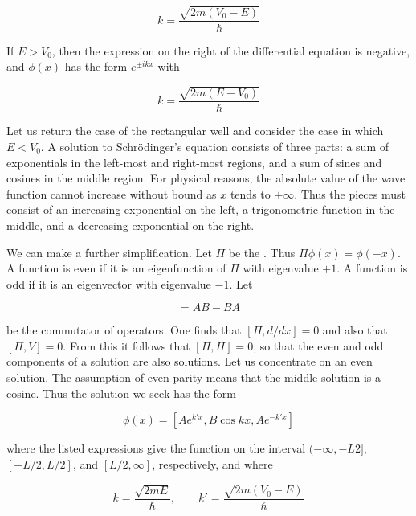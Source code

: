 \begin{equation}
k = \frac{\sqrt{2m(V_0-E)}}{\hbar}
\end{equation}

If $E > V_0$, then the expression on the right of the differential equation is negative, and  $\phi(x)$ has the form $e^{\pm i kx}$ with

\begin{equation}
k = \frac{\sqrt{2m(E-V_0)}}{\hbar}
\end{equation}


Let us return the case of the rectangular well and consider the case in which $E < V_0$.   A solution to Schrödinger's equation consists of three parts: a sum of exponentials in the left-most and right-most regions, and a sum of sines and cosines in the middle region.  For physical reasons, the absolute value of the wave function cannot increase without bound as $x$ tends to $\pm \infty$.  Thus the pieces must consist of an increasing exponential on the left, a trigonometric function in the middle, and a decreasing exponential on the right.

We can make a further simplification.  Let $\Pi$ be the . Thus $\Pi\phi(x) = \phi(-x)$.  A function is even if it
is an eigenfunction of $\Pi$ with eigenvalue $+1$.  A function is odd if it is an eigenvector with eigenvalue $-1$.
Let

\begin{equation}
   [ A,B ]  = AB - BA
\end{equation}

be the commutator of operators.  One finds that
$ [\Pi, d/dx ] = 0$ and also that
$ [ \Pi , V ]  = 0$.  From this it follows that
$  [  \Pi, H ] = 0  $,
so that the even and odd components of a solution are also solutions. Let us concentrate on an even solution.  The assumption of even parity means that the middle solution is a cosine.  Thus the solution we seek has the form

\begin{equation}
\phi(x) = [Ae^{k'x} , B\cos kx , A e^{-k'x}]
\end{equation}

where the listed expressions give the function on the interval $(-\infty, -L2]$, $[-L/2, L/2]$, and $[L/2, \infty]$, respectively, and
where

\begin{equation}
k = \frac{\sqrt{2mE}}{\hbar}, \qquad k' = \frac{\sqrt{2m(V_0-E)}}{\hbar}
\end{equation}

